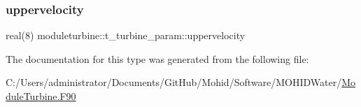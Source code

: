 \subsubsection{\texorpdfstring{uppervelocity}{uppervelocity}}
{\footnotesize\ttfamily real(8) moduleturbine\+::t\+\_\+turbine\+\_\+param\+::uppervelocity\hspace{0.3cm}{\ttfamily [private]}}



The documentation for this type was generated from the following file\+:\begin{DoxyCompactItemize}
\item 
C\+:/\+Users/administrator/\+Documents/\+Git\+Hub/\+Mohid/\+Software/\+M\+O\+H\+I\+D\+Water/\mbox{\hyperlink{_module_turbine_8_f90}{Module\+Turbine.\+F90}}\end{DoxyCompactItemize}
